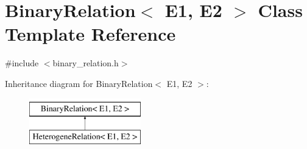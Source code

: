 \hypertarget{classBinaryRelation}{}\section{Binary\+Relation$<$ E1, E2 $>$ Class Template Reference}
\label{classBinaryRelation}


{\ttfamily \#include $<$binary\+\_\+relation.\+h$>$}

Inheritance diagram for Binary\+Relation$<$ E1, E2 $>$\+:\begin{figure}[H]
\begin{center}
\leavevmode
\includegraphics[height=2.000000cm]{classBinaryRelation}
\end{center}
\end{figure}
